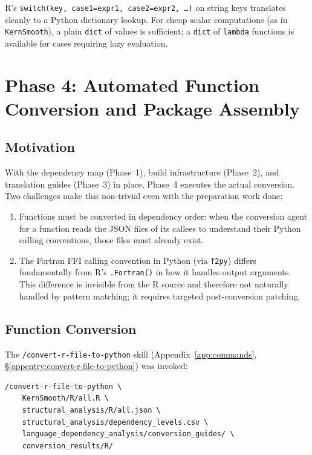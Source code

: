 \documentclass[12pt,a4paper]{article}
\begin{document}
R's \texttt{switch(key, case1=expr1, case2=expr2, \ldots)} on string keys translates cleanly to a Python dictionary lookup. For cheap scalar computations (as in \texttt{KernSmooth}), a plain \texttt{dict} of values is sufficient; a \texttt{dict} of \texttt{lambda} functions is available for cases requiring lazy evaluation.

\section{Phase 4: Automated Function Conversion and Package Assembly}

\subsection{Motivation}

With the dependency map (Phase~1), build infrastructure (Phase~2), and translation guides (Phase~3) in place, Phase~4 executes the actual conversion. Two challenges make this non-trivial even with the preparation work done:

\begin{enumerate}
  \item Functions must be converted in dependency order: when the conversion agent for a function reads the JSON files of its callees to understand their Python calling conventions, those files must already exist.
  \item The Fortran FFI calling convention in Python (via \texttt{f2py}) differs fundamentally from R's \texttt{.Fortran()} in how it handles output arguments. This difference is invisible from the R source and therefore not naturally handled by pattern matching; it requires targeted post-conversion patching.
\end{enumerate}

\subsection{Function Conversion}

The \texttt{/convert-r-file-to-python} skill (Appendix~\ref{app:commands}, \S\ref{appentry:convert-r-file-to-python}) was invoked:

\begin{lstlisting}[style=shell]
/convert-r-file-to-python \
    KernSmooth/R/all.R \
    structural_analysis/R/all.json \
    structural_analysis/dependency_levels.csv \
    language_dependency_analysis/conversion_guides/ \
    conversion_results/R/
\end{lstlisting}
\end{document}
